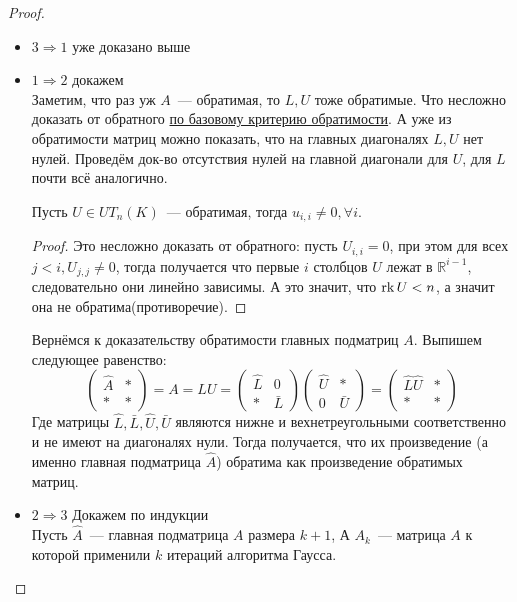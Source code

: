 \begin{proof}\leavevmode
    \begin{itemize}
        \item $3\Rightarrow 1$ уже доказано выше
        \item  $1\Rightarrow 2$ докажем\\
            Заметим, что раз уж $A$~--- обратимая, то $L, U$ тоже обратимые. Что несложно доказать
            от обратного \hyperref[stm:Базовый критерий обратимости]{по базовому критерию обратимости}.
            А уже из обратимости матриц можно показать, что на главных диагоналях $L, U$ нет нулей. 
            Проведём док-во отсутствия нулей на главной диагонали для $U$, для $L$ почти всё аналогично.

            \begin{lemma}
                Пусть $U\in UT_n(K)$~--- обратимая, тогда $u_{i,i}\not=0, \forall i$.
            \end{lemma}
            \begin{proof}
                Это несложно доказать от обратного: пусть $U_{i,i} = 0$, при этом для всех $j < i, U_{j,j}\not=0$, тогда получается
                что первые $i$ столбцов $U$ лежат в $\mathbb{R}^{i-1}$, следовательно они линейно зависимы. А это значит, что
                $\operatorname{rk} U < n$, а значит она не обратима(противоречие).
            \end{proof}
            Вернёмся к доказательству обратимости главных подматриц $A$. Выпишем следующее равенство:
            \[
            \left(\begin{array}{c|c}
                    \hat{A} & * \\
                    \hline
                    * & *
            \end{array}\right) = A = LU = 
            \left(\begin{array}{c|c}
                    \hat{L} & 0\\
                    \hline
                    * & \bar{L}
            \end{array}\right)
            \left(\begin{array}{c|c}
                    \hat{U} & *\\
                    \hline
                    0 & \bar{U}
            \end{array}\right) =
            \left(\begin{array}{c|c}
                    \hat{L} \hat{U} & *\\
                    \hline
                    * & *
            \end{array}\right)
            \] 
            Где матрицы $\hat{L}, \bar{L}, \hat{U}, \bar{U}$ являются нижне и вехнетреугольными соответственно и не
            имеют на диагоналях нули.
            Тогда получается, что их произведение (а именно главная подматрица $\hat{A}$) обратима как 
            произведение обратимых матриц.
        \item $2\Rightarrow 3$ Докажем по индукции\\
            Пусть $\hat{A}$~--- главная подматрица $A$ размера $k + 1$,
            А $A_k$~--- матрица $A$ к которой применили $k$ итераций алгоритма Гаусса.


\end{itemize}
\end{proof}
